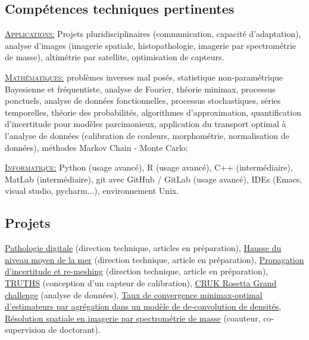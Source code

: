 \documentclass[11pt,a4paper,sans]{moderncv} %
\begin{document}
\subsection{Compétences techniques pertinentes}
\begin{multicols}{2}
\underline{\textsc{Applications:}}
Projets pluridisciplinaires (communication, capacité d'adaptation),
analyse d'images (imagerie spatiale, histopathologie, imagerie par spectrométrie de masse),
altimétrie par satellite,
optimisation de capteurs.

\underline{\textsc{Mathématiques:}}
problèmes inverses mal posés,
statistique non-paramétrique Bayesienne et fréquentiste,
analyse de Fourier,
théorie minimax,
processus ponctuels,
analyse de données fonctionnelles,
processus stochastiques,
séries temporelles,
théorie des probabilités,
algorithmes d'approximation,
quantification d'incertitude pour modèles parcimonieux,
application du transport optimal à l'analyse de données (calibration de couleurs, morphométrie, normalisation de données),
méthodes Markov Chain - Monte Carlo;

\underline{\textsc{Informatique:}}
Python (usage avancé),
R (usage avancé),
C++ (intermédiaire),
MatLab (intermédiaire),
git avec GitHub / GitLab (usage avancé),
IDEs (Emacs, visual studio, pycharm...),
environnement Unix.

\end{multicols}

\subsection{Projets}
\href{https://www.npl.co.uk/news/next-generation-of-digital-pathology}{Pathologie digitale} \textsubscript{} (direction technique, articles en préparation),
\href{https://www.bipmwmo22.org/submissions/submission/137}{Hausse du niveau moyen de la mer} \textsubscript{} (direction technique, article en préparation),
\href{https://www.bipmwmo22.org/submissions/submission/138}{Propagation d'incertitude et re-meshing}\textsubscript{} (direction technique, article en préparation),
\href{https://www.npl.co.uk/earth-observation/truths}{TRUTHS}\textsubscript{} (conception d'un capteur de calibration),
\href{https://www.npl.co.uk/grand-challenge}{CRUK Rosetta Grand challenge}\textsubscript{} (analyse de données),
\href{https://arxiv.org/pdf/2102.01037}{Taux de convergence minimax-optimal d'estimateurs par agrégation dans un modèle de de-convolution de densités}\textsubscript{},
\href{https://pubs.acs.org/doi/abs/10.1021/acs.analchem.1c02470}{Résolution spatiale en imagerie par spectrométrie de masse}\textsubscript{} (coauteur, co-supervision de doctorant).
\end{document}
